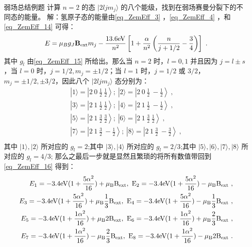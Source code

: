 \begin{example}{弱场总结例题}
计算 $n=2$ 的态 $|2ljm_j\rangle$ 的八个能级，找到在弱场赛曼分裂下的不同态的能量。
解：氢原子态的能量由\autoref{eq_ZemEff_3} ，\autoref{eq_ZemEff_4} ，和\autoref{eq_ZemEff_14} 可得：
\begin{equation}
E=\mu_Bg_J\mathbf{B}_{\rm{ext}}m_j-\frac{13.6\rm{eV}}{n^2}\left[1+\frac{\alpha}{n^2}\left(\frac{n}{j+1/2}-\frac{3}{4}\right)\right]~.
\end{equation}
其中 $g_l$ 由\autoref{eq_ZemEff_15} 所给出。那么当 $n=2$ 时，$l=0,1$ 并且因为 $j=l\pm s$，当 $l=0$ 时，$j=1/2,m_j=\pm 1/2$；当 $l=1$ 时，$j=1/2$ 或 $3/2$，$m_j=\pm 1/2,\pm 3/2$，因此八个 $|2ljm_j\rangle$ 态分别为：
\begin{align}
|1\rangle =\left|2 \ 0 \ \frac{1}{2} \ \frac{1}{2}\right\rangle;\ 
|2\rangle =\left|2 \ 0 \ \frac{1}{2} \ -\frac{1}{2}\right\rangle~,\\
|3\rangle =\left|2 \ 1 \ \frac{1}{2} \ \frac{1}{2}\right\rangle;\ 
|4\rangle =\left|2 \ 1 \ \frac{1}{2} \ -\frac{1}{2}\right\rangle~,\\
|5\rangle =\left|2 \ 1 \ \frac{3}{2} \ \frac{3}{2}\right\rangle;\ 
|6\rangle =\left|2 \ 1 \ \frac{3}{2} \ \frac{1}{2}\right\rangle~,\\
|7\rangle =\left|2 \ 1 \ \frac{3}{2} \ -\frac{1}{2}\right\rangle;\ 
|8\rangle =\left|2 \ 1 \ \frac{3}{2} \ -\frac{3}{2}\right\rangle~,\\
\end{align}
其中 $|1\rangle,|2\rangle$ 所对应的 $g_l=2$;其中 $|3\rangle,|4\rangle$ 所对应的 $g_l=2/3$;其中 $|5\rangle,|6\rangle,|7\rangle,|8\rangle$ 所对应的 $g_l=4/3$;
那么之最后一步就是显然且繁琐的将所有数值带回到\autoref{eq_ZemEff_16} 得到：
\begin{align}
E_1=-3.4\rm{eV}(1+\frac{5\alpha^2}{16})+\mu_BB_{\rm{ext}},\ 
E_2=-3.4\rm{eV}(1+\frac{5\alpha^2}{16})-\mu_BB_{\rm{ext}}~,\\
E_3=-3.4\rm{eV}(1+\frac{5\alpha^2}{16})+\mu_B\frac{1}{3}B_{\rm{ext}},\ 
E_4=-3.4\rm{eV}(1+\frac{5\alpha^2}{16})-\mu_B\frac{1}{3}B_{\rm{ext}}~,\\
E_5=-3.4\rm{eV}(1+\frac{1\alpha^2}{16})+\mu_B2B_{\rm{ext}},\ 
E_6=-3.4\rm{eV}(1+\frac{1\alpha^2}{16})+\mu_B\frac{2}{3}B_{\rm{ext}}~,\\
E_7=-3.4\rm{eV}(1+\frac{1\alpha^2}{16})-\mu_B\frac{2}{3}B_{\rm{ext}},\ 
E_8=-3.4\rm{eV}(1+\frac{1\alpha^2}{16})-\mu_B2B_{\rm{ext}}~.
\end{align}

\end{example}

